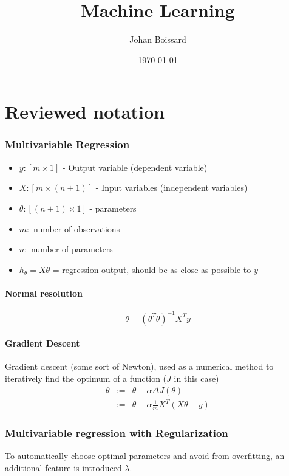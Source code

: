 \documentclass[a4paper,titlepage] {scrartcl}
\author{Johan Boissard}
\date{\today}
\title{Machine Learning}
\begin{document}
\part{Reviewed notation}

\section{Multivariable Regression}

\begin{itemize}
	\item $y: [m \times 1]$ - Output variable (dependent variable)
	\item $X: [m \times (n+1)]$ - Input variables (independent variables)
	\item $\theta: [(n+1) \times 1]$ - parameters
	\item $m: $ number of observations
	\item $n: $ number of parameters
	\item $h_\theta = X\theta$ = regression output, should be as close as possible to $y$
\end{itemize}

\subsection{Normal resolution}
\begin{equation}
	\theta = (\theta^T\theta)^{-1}X^Ty
\end{equation}

\subsection{Gradient Descent}
Gradient descent (some sort of Newton), used as a numerical method to iteratively find the optimum of a function ($J$ in this case)
\begin{eqnarray}
	\theta &:=& \theta - \alpha\Delta J(\theta)\\
	&:=& \theta - \alpha\frac{1}{m}X^T(X\theta - y)
\end{eqnarray}

\section{Multivariable regression with Regularization}
To automatically choose optimal parameters and avoid from overfitting, an additional feature is introduced $\lambda$.
\end{document}
